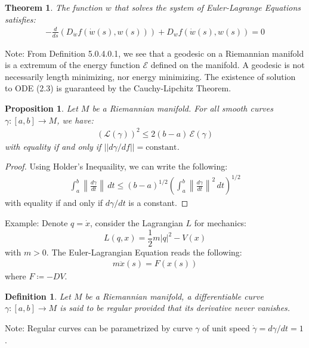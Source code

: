 \documentclass[11pt]{book}
\theoremstyle{break}
\theoremstyle{break}
\newtheorem{thm}{Theorem}[section]
\newtheorem{prop}[lem]{Proposition}
\newtheorem{defn}{Definition}[corL]
\newcommand{\note}{\color{red}Note: \color{black}}
\newcommand{\example}{\color{green}Example: \color{black}}
\begin{document}
\begin{thm}
The function $w$ that solves the system of Euler-Lagrange Equations satisfies:
\begin{align*}
-\frac{d}{ds}\left( D_{\dot{w}}f(\dot{w}(s), w(s))\right) + D_wf(\dot{w}(s),w(s)) = 0
\end{align*}
\end{thm}

\note From Definition 5.0.4.0.1, we see that a geodesic on a Riemannian manifold is a extremum of the energy function $\mathcal{E}$ defined on the manifold. A geodesic is not necessarily length minimizing, nor energy minimizing. The existence of solution to ODE (2.3) is guaranteed by the Cauchy-Lipchitz Theorem. 

\begin{prop}
Let $M$ be a Riemannian manifold. For all smooth curves $\gamma:[a,b]\to M$, we have:
\begin{align*}
\left(\mathcal{L}(\gamma)\right)^2 \leq 2(b-a)\, \mathcal{E}(\gamma)
\end{align*}
with equality if and only if $||d\gamma/df|| = \text{constant}$. 
\end{prop}
\begin{proof}
Using Holder's Inequaility, we can write the following:
\begin{align*}
\int_a^b \left\| \frac{d\gamma}{dt}\right\|\, dt \leq (b-a)^{1/2}\left( \int_a^b \left\|\frac{d\gamma}{dt}\right\|^2\, dt\right)^{1/2}
\end{align*}
with equality if and only if $d\gamma/dt$ is a constant. 
\end{proof}


\example Denote $q = \dot{x}$, consider the Lagrangian $L$ for mechanics: 
$$L(q,x) = \frac{1}{2}m|q|^2 - V(x)$$
with $m> 0$. The Euler-Lagrangian Equation reads the following:
\begin{align*}
m\ddot{x}(s) = F(x(s))
\end{align*}
where $F\coloneqq -DV$. \\



\begin{defn}
Let $M$ be a Riemannian manifold, a differentiable curve $\gamma:[a,b]\to M$ is said to be regular provided that its derivative never vanishes.
\end{defn}

\note Regular curves can be parametrized by curve $\gamma$ of unit speed $\dot{\gamma} =d\gamma/dt = 1$.
\end{document}
